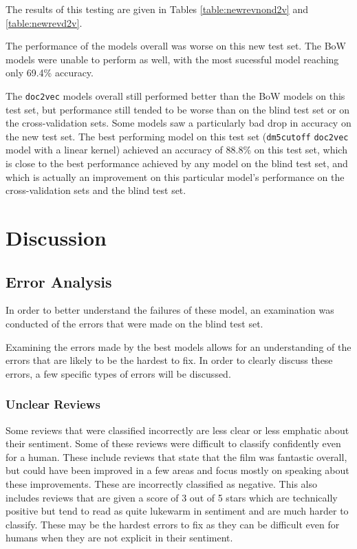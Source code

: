 \documentclass[twocolumn]{article}
\begin{document}
The results of this testing are given in Tables \ref{table:newrevnond2v} and \ref{table:newrevd2v}.

The performance of the models overall was worse on this new test set. The BoW models were unable to perform as well, with the most sucessful model reaching only 69.4\% accuracy.

The \texttt{doc2vec} models overall still performed better than the BoW models on this test set, but performance still tended to be worse than on the blind test set or on the cross-validation sets. Some models saw a particularly bad drop in accuracy on the new test set. The best performing model on this test set (\texttt{dm5cutoff} \texttt{doc2vec} model with a linear kernel) achieved an accuracy of 88.8\% on this test set, which is close to the best performance achieved by any model on the blind test set, and which is actually an improvement on this particular model's performance on the cross-validation sets and the blind test set.

\section{Discussion}


\subsection{Error Analysis}

In order to better understand the failures of these model, an examination was conducted of the errors that were made on the blind test set.

Examining the errors made by the best models allows for an understanding of the errors that are likely to be the hardest to fix. In order to clearly discuss these errors, a few specific types of errors will be discussed.

\subsubsection{Unclear Reviews}

Some reviews that were classified incorrectly are less clear or less emphatic about their sentiment. Some of these reviews were difficult to classify confidently even for a human. These include reviews that state that the film was fantastic overall, but could have been improved in a few areas and focus mostly on speaking about these improvements. These are incorrectly classified as negative. This also includes reviews that are given a score of 3 out of 5 stars which are technically positive but tend to read as quite lukewarm in sentiment and are much harder to classify. These may be the hardest errors to fix as they can be difficult even for humans when they are not explicit in their sentiment.
\end{document}
